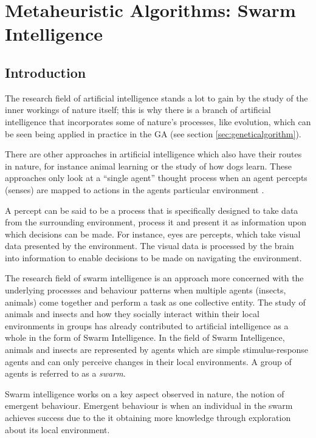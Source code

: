 \chapter[Swarm Intelligence]{Metaheuristic Algorithms: Swarm Intelligence}
\label{chpt:swarm}
\section{Introduction}
The research field of artificial intelligence stands a lot to gain by the study of the inner workings of nature itself; this is why there is a branch of artificial intelligence that incorporates some of nature's processes, like evolution, which can be seen being applied in practice in the \gls{GA} (see section \ref{sec:geneticalgorithm}).

 There are other approaches in artificial intelligence which also have their routes in nature, for instance animal learning or the study of how dogs learn\cite{DLearning}. These approaches only look at a “single agent” thought process when an agent percepts (senses) are mapped to actions in the agents particular environment \cite{DLearning}. 
 
 A percept can be said to be a process that is specifically designed to take data from the surrounding environment, process it and present it as information upon which decisions can be made\cite{DLearning,AIModernApproach}. For instance, eyes are percepts, which take visual data presented by the environment\cite{DLearning,AIModernApproach}. The visual data is processed by the brain into information to enable decisions to be made on navigating the environment\cite{DLearning,AIModernApproach}.

The research field of swarm intelligence is an approach more concerned with the underlying processes and behaviour patterns when multiple agents (insects, animals) come together and perform a task as one collective entity\cite{DLearning,AIModernApproach,ChaoticSwarmIntel,BeeJobShop}.  The study of animals and insects and how they socially interact within their local environments in groups has already contributed to artificial intelligence as a whole in the form of Swarm Intelligence\cite{ChaoticSwarmIntel,BeeJobShop}.  In the field of Swarm Intelligence, animals and insects are represented by agents which are simple stimulus-response agents and can only perceive changes in their local environments. A group of agents is referred to as a \emph{swarm}.

Swarm intelligence works on a key aspect observed in nature, the notion of emergent behaviour\cite{SwarmArt,CompuIntelligenceIntro,FundamentalSwarm}. Emergent behaviour is when an individual in the swarm achieves success due to the it obtaining more knowledge through exploration about its local environment\cite{SwarmArt,CompuIntelligenceIntro,FundamentalSwarm}.

